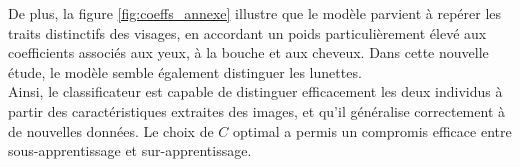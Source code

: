 \documentclass[a4paper,12pt]{article}
\begin{document}
De plus, la figure \ref{fig:coeffs_annexe} illustre que le modèle parvient à repérer les traits distinctifs des visages, en accordant un poids particulièrement élevé aux coefficients associés aux yeux, à la bouche et aux cheveux. Dans cette nouvelle étude, le modèle semble également distinguer les lunettes.\\
 
Ainsi, le classificateur est capable de distinguer efficacement les deux individus à partir des caractéristiques extraites des images, et qu’il généralise correctement à de nouvelles données. Le choix de $C$ optimal a permis un compromis efficace entre sous-apprentissage et sur-apprentissage.
\end{document}
